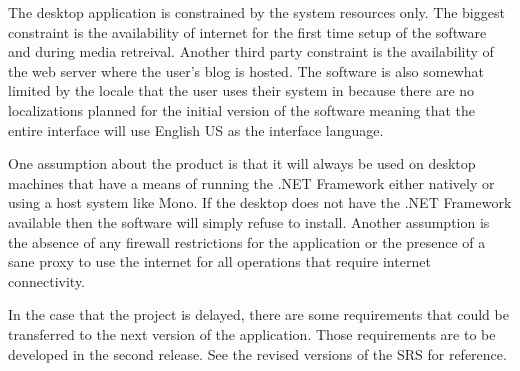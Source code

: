 The desktop application is constrained by the system resources only. The biggest constraint is the availability of
internet for the first time setup of the software and during media retreival. Another third party constraint is the
availability of the web server where the user's blog is hosted. The software is also somewhat limited by the locale that
the user uses their system in because there are no localizations planned for the initial version of the software meaning
that the entire interface will use English US as the interface language.


One assumption about the product is that it will always be used on desktop machines that have a means of running the
.NET Framework either natively or using a host system like Mono. If the desktop does not have the .NET Framework
available then the software will simply refuse to install. Another assumption is the absence of any firewall
restrictions for the application or the presence of a sane proxy to use the internet for all operations that require
internet connectivity.


In the case that the project is delayed, there are some requirements that could be transferred to the next version of
the application. Those requirements are to be developed in the second release. See the revised versions of the SRS for
reference.
